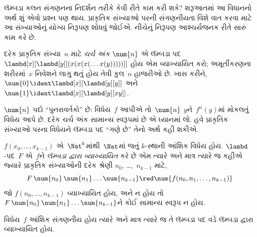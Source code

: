 \begingroup
\makeatletter{}\makeatother

\label{guunit:OLP-0348}


લૅમ્બડા કલન સંગણનના નિદર્શન તરીકે કેવી રીતે કામ કરી શકે? શરૂઆતમાં
આ વિધાનનો અર્થ શું એવો પ્રશ્ન પણ થાય. પ્રાકૃતિક સંખ્યાઓ પરની
સંગણનીયતા વિશે વાત કરવા માટે આ સંખ્યાઓનું યોગ્ય નિરૂપણ શોધવું
જોઈએ. નીચેનું નિરૂપણ આશ્ચર્યજનક રીતે સારું કામ કરે છે.

\begin{defn}
દરેક પ્રાકૃતિક સંખ્યા~$n$ માટે \emph{ચર્ચ અંક}
$\num{n}$ એ લૅમ્બડા પદ $\lambd[x][\lambd[y][(x(x(x(\dots
x(y)))))]]$ હોય એમ વ્યાખ્યાયિત કરો; અમૂર્તીકરણના શરીરમાં~$x$
નિવેશને લાગુ થતું હોય તેવી કુલ~$n$ હાજરીઓ છે. ખાસ કરીને,
$\num{0}\ident\lambd[x][\lambd[y][y]]$ અને
$\num{1}\ident\lambd[x][\lambd[y][xy]]$.
\end{defn}

$\num{n}$ પદો ``પુનરાવર્તકો'' છે: વિધેય~$f$ આપીએ તો~$\num{n}$
$y$ને~$f^n(y)$માં મોકલતું વિધેય આપે છે. દરેક ચર્ચ અંક સામાન્ય
સ્વરૂપમાં છે એ ધ્યાનમાં લો. હવે પ્રાકૃતિક સંખ્યાઓ પરના વિધેયને
લૅમ્બડા પદ ``ગણે છે'' તેનો અર્થ કહી શકીએ.

\begin{defn}
$f(x_0, \dots, x_{k-1})$ એ~$\Nat^k$માંથી~$\Nat$માં જતું
$k$-સ્થાની આંશિક વિધેય હોય. $\lambd$-પદ~$F$ એ~$f$ને
\emph{લૅમ્બડા દ્વારા વ્યાખ્યાયિત} કરે છે એમ ત્યારે અને માત્ર ત્યારે જ
કહીએ જ્યારે પ્રાકૃતિક સંખ્યાઓની દરેક શ્રેણી $n_0$, \dots,~$n_{k-1}$
માટે,
\[
F\, \num{n_0}\, \num{n_1} \dots \num{n_{k-1}} \red \num{f(n_0, n_1, \dots,
  n_{k-1})}
\]
જો $f(n_0, \dots, n_{k-1})$ વ્યાખ્યાયિત હોય, અને ન હોય તો
$F\, \num{n_0}\, \num{n_1} \dots \num{n_{k-1}}$ને કોઈ સામાન્ય
સ્વરૂપ ન હોય.
\end{defn}

\begin{thm}
વિધેય~$f$ આંશિક સંગણનીય હોય ત્યારે અને માત્ર ત્યારે જ તે
લૅમ્બડા પદ વડે લૅમ્બડા દ્વારા વ્યાખ્યાયિત હોય.
\end{thm}

